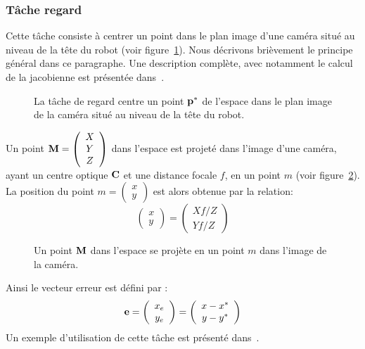 \subsubsection{T\^ache regard}
Cette t\^ache consiste à centrer un point dans le plan image d'une caméra
situé au niveau de la t\^ete du robot (voir figure~\ref{fig:featureVis}).
Nous décrivons brièvement le principe général dans ce paragraphe. Une description
complète, avec notamment le calcul de la jacobienne est présentée dans~\cite{espiau92, chaumette06, chaumette07}.
\begin{figure}[t]
  \begin{center}
    \resizebox{0.95\textwidth}{!}{
    
    }
  \end{center}
  \caption[T\^ache de regard.]{La t\^ache de regard centre un point ${\mathbf{p}}^*$ de l'espace
  dans le plan image de la caméra situé au niveau de la tête du robot.}
  \label{fig:featureVis}
\end{figure}
Un point ${\mathbf{M}} = \left( \begin{array}{c} X\\ Y\\ Z\end{array} \right)$ dans l'espace
est projeté dans l'image d'une caméra, ayant un centre optique ${\mathbf{C}}$ et une 
distance focale $f$, en un point $m$ (voir figure~\ref{fig:cameraProj}).
La position du point $m = \left( \begin{array}{c} x\\ y \end{array} \right)$ est alors obtenue par la relation:
\begin{equation}
  \left( \begin{array}{c} x\\ y \end{array} \right) = 
    \left( \begin{array}{c} Xf/Z\\ Yf/Z \end{array} \right) 
  \label{eq:camProj3D}
\end{equation}
\begin{figure}[t]
  \begin{center}
    \resizebox{0.4\textwidth}{!}{
    
    }
  \end{center}
  \caption{Un point ${\mathbf{M}}$ dans l'espace se projète en un point $m$ dans l'image de la caméra.}
  \label{fig:cameraProj}
\end{figure}
Ainsi le vecteur erreur est défini par :
\begin{equation}
  \mbf{e} = \left( \begin{array}{c} x_e \\ y_e \end{array} \right)
    = \left( \begin{array}{c} x-x^* \\ y-y^* \end{array} \right)
  \label{eq:visError}
\end{equation}
Un exemple d'utilisation de cette t\^ache est présenté dans~\cite{mansard07a}.

